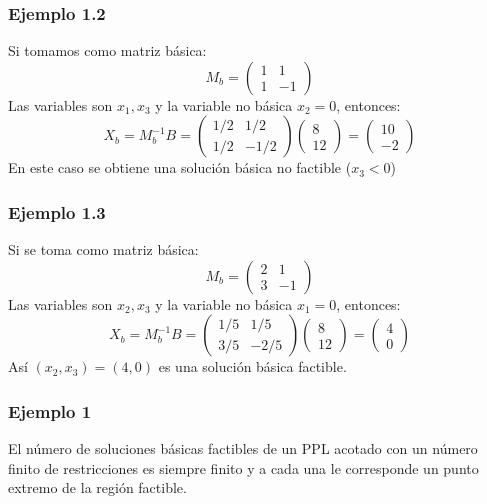 \documentclass{beamer}
\begin{document}
\begin{frame}
\frametitle{Ejemplo 1.2}
Si tomamos como matriz b\'asica:
\[M_b=\left(\begin{array}{cc}1&1 \\1&-1\end{array}\right)\]
Las variables son $x_1,x_3$ y la variable no b\'asica $x_2=0$, entonces:
\[X_b = M_b^{-1} B= \left(\begin{array}{cc}1/2&1/2 \\1/2&-1/2\end{array}\right) \left(\begin{array}{c}8 \\12\end{array}\right) = \left(\begin{array}{c}10 \\-2\end{array}\right)\]
En este caso se obtiene una soluci\'on b\'asica no factible ($x_3<0$)
\end{frame}

\begin{frame}
\frametitle{Ejemplo 1.3}
Si se toma como matriz b\'asica:
\[M_b=\left(\begin{array}{cc}2&1 \\3&-1\end{array}\right)\]
Las variables son $x_2,x_3$ y la variable no b\'asica $x_1=0$, entonces:
\[X_b = M_b^{-1} B= \left(\begin{array}{cc}1/5&1/5 \\3/5&-2/5\end{array}\right) \left(\begin{array}{c}8 \\12\end{array}\right) = \left(\begin{array}{c}4 \\0\end{array}\right)\]
As\'i $(x_2,x_3) = (4,0)$ es una soluci\'on b\'asica factible.
\end{frame}


\begin{frame}
\frametitle{Ejemplo 1}
El n\'umero de soluciones b\'asicas factibles de un PPL acotado con un n\'umero finito de restricciones es siempre finito y a cada una le corresponde un punto extremo de la regi\'on factible.
\end{frame}
\end{document}
